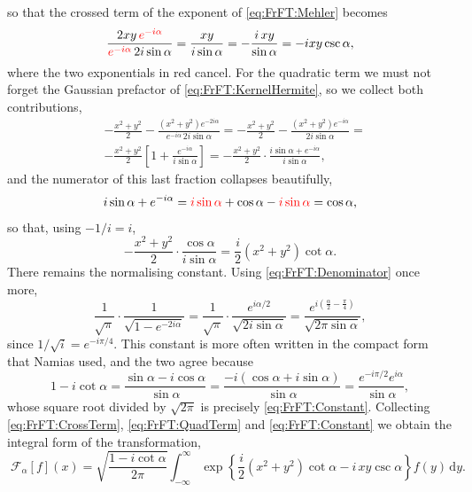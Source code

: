 			so that the crossed term of the exponent of \eqref{eq:FrFT:Mehler} becomes
			\begin{equation}\label{eq:FrFT:CrossTerm}
				\frac{2xy\,{\color{red}e^{-i\alpha}}}{{\color{red}e^{-i\alpha}}\,2i\sin\alpha} = \frac{xy}{i\sin\alpha} = -\frac{i\,xy}{\sin\alpha} = -ixy\csc\alpha,
			\end{equation}
			where the two exponentials in red cancel. For the quadratic term we must not forget the Gaussian prefactor of \eqref{eq:FrFT:KernelHermite}, so we collect both contributions,
			\begin{align*}
				& -\frac{x^{2}+y^{2}}{2} - \frac{\left(x^{2}+y^{2}\right)e^{-2i\alpha}}{e^{-i\alpha}\,2i\sin\alpha} = -\frac{x^{2}+y^{2}}{2} - \frac{\left(x^{2}+y^{2}\right)e^{-i\alpha}}{2i\sin\alpha} = \\
				& -\frac{x^{2}+y^{2}}{2}\left[1 + \frac{e^{-i\alpha}}{i\sin\alpha}\right] = -\frac{x^{2}+y^{2}}{2}\cdot\frac{i\sin\alpha + e^{-i\alpha}}{i\sin\alpha},
			\end{align*}
			and the numerator of this last fraction collapses beautifully,
			\begin{equation}\label{eq:FrFT:Collapse}
				i\sin\alpha + e^{-i\alpha} = {\color{red}i\sin\alpha} + \cos\alpha - {\color{red}i\sin\alpha} = \cos\alpha,
			\end{equation}
			so that, using $-1/i = i$,
			\begin{equation}\label{eq:FrFT:QuadTerm}
				-\frac{x^{2}+y^{2}}{2}\cdot\frac{\cos\alpha}{i\sin\alpha} = \frac{i}{2}\left(x^{2}+y^{2}\right)\cot\alpha.
			\end{equation}
			There remains the normalising constant. Using \eqref{eq:FrFT:Denominator} once more,
			\begin{equation}\label{eq:FrFT:Constant}
				\frac{1}{\sqrt{\pi}}\cdot\frac{1}{\sqrt{1-e^{-2i\alpha}}} = \frac{1}{\sqrt{\pi}}\cdot\frac{e^{i\alpha/2}}{\sqrt{2i\sin\alpha}} = \frac{e^{i\left(\frac{\alpha}{2}-\frac{\pi}{4}\right)}}{\sqrt{2\pi\sin\alpha}},
			\end{equation}
			since $1/\sqrt{i} = e^{-i\pi/4}$. This constant is more often written in the compact form that Namias used, and the two agree because
			\begin{equation}\label{eq:FrFT:ConstantEquiv}
				1 - i\cot\alpha = \frac{\sin\alpha - i\cos\alpha}{\sin\alpha} = \frac{-i\left(\cos\alpha + i\sin\alpha\right)}{\sin\alpha} = \frac{e^{-i\pi/2}e^{i\alpha}}{\sin\alpha},
			\end{equation}
			whose square root divided by $\sqrt{2\pi}$ is precisely \eqref{eq:FrFT:Constant}. Collecting \eqref{eq:FrFT:CrossTerm}, \eqref{eq:FrFT:QuadTerm} and \eqref{eq:FrFT:Constant} we obtain the integral form of the transformation,
			\begin{equation}\label{eq:FrFT:Kernel}
				\boxed{\;\mathcal{F}_{\alpha}[f](x) = \sqrt{\frac{1-i\cot\alpha}{2\pi}}\int_{-\infty}^{\infty}\exp\left\{\frac{i}{2}\left(x^{2}+y^{2}\right)\cot\alpha - i\,xy\csc\alpha\right\}f(y)\,\mathrm{d}y.\;}
			\end{equation}

